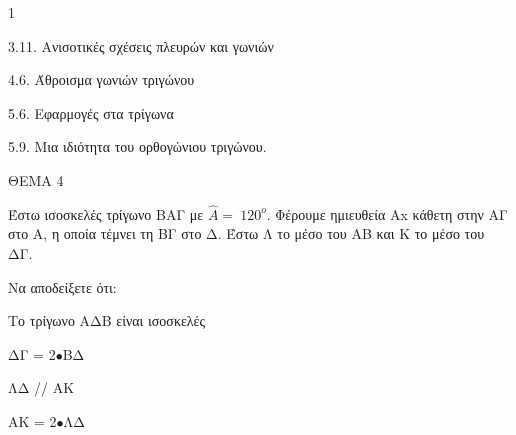 \begin{ylh}{1}
    \item 3.11. Ανισοτικές σχέσεις πλευρών και γωνιών
    \item 4.6. Άθροισμα γωνιών τριγώνου
    \item 5.6. Εφαρμογές στα τρίγωνα
    \item 5.9. Μια ιδιότητα του ορθογώνιου τριγώνου.
\end{ylh}

ΘΕΜΑ 4

Έστω ισοσκελές τρίγωνο ΒΑΓ με $\widehat{Α} = \ 120^{ο}$. Φέρουμε ημιευθεία Αx κάθετη στην ΑΓ στο Α, η οποία τέμνει τη ΒΓ στο Δ. Έστω Λ το μέσο του ΑΒ και Κ το μέσο του ΔΓ.

Να αποδείξετε ότι:

\begin{alist}
\item Το τρίγωνο ΑΔΒ είναι ισοσκελές 

\item ΔΓ = 2$\bullet$ΒΔ 

\item ΛΔ // ΑΚ 

\item ΑΚ = 2$\bullet$ΛΔ 


\end{alist}

